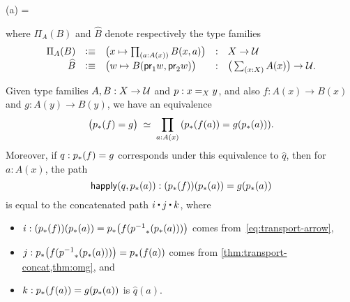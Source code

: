\documentclass[hott-all.tex]{subfiles}
\begin{document}
\begin{narrowmultline*}
  (a) =\narrowbreak
\end{narrowmultline*}

where $\Pi_A(B)$ and $\widehat{B}$ denote respectively the type families
\begin{equation}\label{eq:transport-arrow-families}
\begin{array}{rclcl}
\Pi_A(B) &\defeq& \big(x\mapsto \prd{a:A(x)} B(x,a) \big) &:& X\to \type\\
\widehat{B} &\defeq& \big(w \mapsto B(\proj1w,\proj2w) \big) &:& \big(\sm{x:X} A(x)\big) \to \type.
\end{array}
\end{equation}
%
%
\begin{lem}\label{thm:dpath-arrow}
  Given type families $A,B:X\to\type$ and $p:\id[X]xy$, and also $f:A(x)\to B(x)$ and $g:A(y)\to B(y)$, we have an equivalence
  \[ \eqvspaced{ \big(\trans{p}{f} = {g}\big) } { \prd{a:A(x)}  (\trans{p}{f(a)} = g(\trans{p}{a})) }. \]
  Moreover, if $q:\trans{p}{f} = {g}$ corresponds under this equivalence to $\widehat q$, then for $a:A(x)$, the path
  \[ \happly(q,\trans p a) : (\trans p f)(\trans p a) = g(\trans p a)\]
  is equal to the concatenated path $i\ct j\ct k$, where
  \begin{itemize}
  \item $i:(\trans p f)(\trans p a) = \trans p {f (\trans {\opp p}{\trans p a})}$ comes from~\eqref{eq:transport-arrow},
  \item $j:\trans p {f (\trans {\opp p}{\trans p a})} = \trans p {f(a)}$ comes from \cref{thm:transport-concat,thm:omg}, and
  \item $k:\trans p {f(a)}= g(\trans p a)$ is $\widehat{q}(a)$.
  \end{itemize}
\end{lem}
\end{document}
